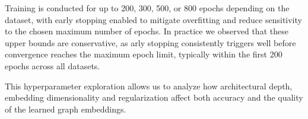 Training is conducted for up to 200, 300, 500, or 800 epochs depending on the dataset, with early
stopping enabled to mitigate overfitting and reduce sensitivity to the chosen maximum number of epochs. 
In practice we observed that these upper bounds are conservative, as arly stopping consistently 
triggers well before convergence reaches the maximum epoch limit, typically within the first 200 epochs 
across all datasets.

This hyperparameter exploration allows us to analyze how architectural depth, embedding dimensionality 
and regularization affect both accuracy and the quality of the learned graph embeddings. 

